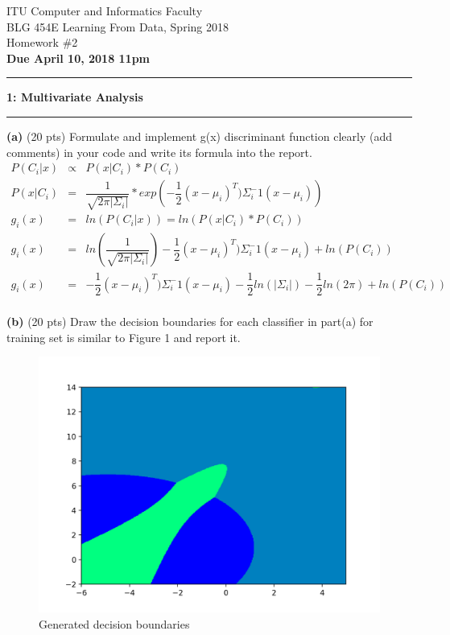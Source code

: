 \documentclass[11pt]{article}
\newcommand\question[2]{\vspace{.25in}\hrule\textbf{#1: #2}\vspace{.5em}\hrule\vspace{.10in}}
\renewcommand\part[1]{\vspace{.10in}\textbf{(#1)}}
\newcommand\header[4]{\begin{center}{#1} \\ {#2} \\ {#3} \\ \textbf{#4} \end{center}}
\begin{document}
\raggedright

\header
	{ITU Computer and Informatics Faculty}
	{BLG 454E Learning From Data, Spring 2018}
	{Homework \#2}
	{Due April 10, 2018 11pm}

\question{1}{Multivariate Analysis} 

\part{a} (20 pts) Formulate and implement g(x) discriminant function clearly (add comments) in your code and write its formula into the report. \\

\begin{eqnarray*}
	P(C_i | x) & \propto & P(x | C_i) * P(C_i) \\
	P(x | C_i) & = & \dfrac{1}{\sqrt{2\pi|\Sigma_i|}} * exp \left( -\dfrac{1}{2} (x - \mu_i)^T) \Sigma_i ^ -1 (x - \mu_i) \right) \\
	g_i(x) & = & ln(P(C_i | x)) = ln(P(x | C_i) * P(C_i)) \\
	g_i(x) & = & ln( \dfrac{1}{\sqrt{2\pi|\Sigma_i|}}) -\dfrac{1}{2} (x - \mu_i)^T) \Sigma_i ^ -1 (x - \mu_i) + ln(P(C_i)) \\
	g_i(x) & = & -\dfrac{1}{2} (x - \mu_i)^T) \Sigma_i ^ -1 (x - \mu_i) -\dfrac{1}{2} ln(|\Sigma_i|) -\dfrac{1}{2}ln(2\pi) + ln(P(C_i)) \\
\end{eqnarray*}

\part{b} (20 pts) Draw the decision boundaries for each classifier in part(a) for training set is similar to Figure 1 and report it.

\begin{figure}[h]
	\centering
	\includegraphics[width=0.6\linewidth]{decision_boundaries}
	\caption{Generated decision boundaries}
	\label{fig:decision_boundaries}
\end{figure}
\end{document}
